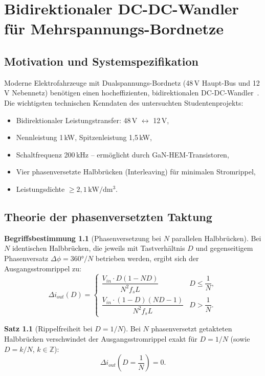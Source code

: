 ﻿\documentclass[a4paper,12pt,openany,oneside]{book}
\newcommand{\abschnitt}[1]{\section{#1}}
\theoremstyle{definition}
\newtheorem{definition}{Begriffsbestimmung}[chapter]
\newtheorem{satz}{Satz}[chapter]
\begin{document}
\chapter{Bidirektionaler DC-DC-Wandler f\"ur Mehrspannungs-Bordnetze}
\label{kap:bidi_dcdc}

\abschnitt{Motivation und Systemspezifikation}

Moderne Elektrofahrzeuge mit Dualspannungs-Bordnetz (48\,V Haupt-Bus und 12\,V
Nebennetz) ben\"otigen einen hocheffizienten, bidirektionalen DC-DC-Wandler~\cite{Keuck2021}.
Die wichtigsten technischen Kenndaten des untersuchten Studentenprojekts:
\begin{itemize}
  \item Bidirektionaler Leistungstransfer: 48\,V $\leftrightarrow$ 12\,V,
  \item Nennleistung 1\,kW, Spitzenleistung 1{,}5\,kW,
  \item Schaltfrequenz 200\,kHz -- erm\"oglicht durch GaN-HEM-Transistoren,
  \item Vier phasenversetzte Halbbrücken (Interleaving) f\"ur minimalen Stromrippel,
  \item Leistungsdichte $\geq 2{,}1\,\mathrm{kW/dm^3}$.
\end{itemize}

\abschnitt{Theorie der phasenversetzten Taktung}

\begin{definition}[Phasenversetzung bei $N$ parallelen Halbbrücken]
  Bei $N$ identischen Halbbrücken, die jeweils mit Tastverhältnis $D$ und
  gegenseitigem Phasenversatz $\Delta\phi = 360 °/N$ betrieben werden, ergibt sich
  der Ausgangsstromrippel zu:
  \[
    \Delta i_{out}(D) =
    \begin{cases}
      \dfrac{V_{in} \cdot D (1 - ND)}{N^2 f_s L} & D \leq \dfrac{1}{N}, \\[6pt]
      \dfrac{V_{in} \cdot (1-D)(ND-1)}{N^2 f_s L} & D > \dfrac{1}{N}.
    \end{cases}
  \]
\end{definition}

\begin{satz}[Rippelfreiheit bei $D = 1/N$]
  Bei $N$ phasenversetzt getakteten Halbbrücken verschwindet der Ausgangsstromrippel
  exakt f\"ur $D = 1/N$ (sowie $D = k/N$, $k \in \mathbb{Z}$):
  \[
    \Delta i_{out}\!\left(D = \frac{1}{N}\right) = 0.
  \]
\end{satz}
\end{document}
